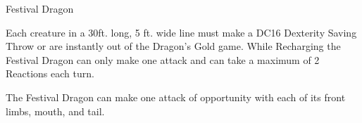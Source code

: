 \begin{DndMonster}[width=0.5\textwidth]{Festival Dragon}
	\DndMonsterAttack[
		name			= Tail,
		distance		= melee,	%
		mod				= -2,
		reach			= 20,
		targets			= one target,
		extra			= {Player is instantly out of the game},
	]
	
	Each creature in a 30ft. long, 5 ft. wide line must make a DC16 Dexterity Saving Throw or are instantly out of the Dragon's Gold game. While Recharging the Festival Dragon can only make one attack and can take a maximum of 2 Reactions each turn.
	
	The Festival Dragon can make one attack of opportunity with each of its front limbs, mouth, and tail.
\end{DndMonster}
